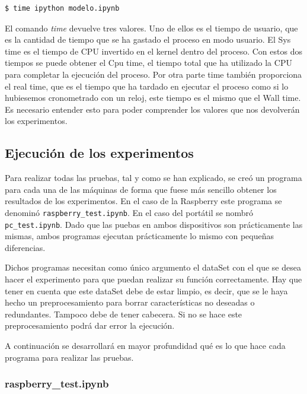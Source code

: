 \documentclass[a4paper, 12pt]{book}
\begin{document}
\begin{lstlisting}[language=bash]
  $ time ipython modelo.ipynb
\end{lstlisting}

El comando \textit{time} devuelve tres valores. Uno de ellos es el tiempo de usuario, que es la cantidad de tiempo que se ha gastado el proceso en modo usuario. El Sys time es el tiempo de CPU invertido en el kernel dentro del proceso. Con estos dos tiempos se puede obtener el Cpu time, el tiempo total que ha utilizado la CPU para completar la ejecución del proceso. Por otra parte time también proporciona el real time, que es el tiempo que ha tardado en ejecutar el proceso como si lo hubiesemos cronometrado con un reloj, este tiempo es el mismo que el Wall time. Es necesario entender esto para poder comprender los valores que nos devolverán los experimentos.

\subsection{Ejecución de los experimentos}
\label{subsec:ejecucion_experimentos}

Para realizar todas las pruebas, tal y como se han explicado, se creó un programa para cada una de las máquinas de forma que fuese más sencillo obtener los resultados de los experimentos. En el caso de la Raspberry este programa se denominó \texttt{raspberry\_test.ipynb}. En el caso del portátil se nombró \texttt{pc\_test.ipynb}. Dado que las puebas en ambos dispositivos son prácticamente las mismas, ambos programas ejecutan prácticamente lo mismo con pequeñas diferencias.

Dichos programas necesitan como único argumento el dataSet con el que se desea hacer el experimento para que puedan realizar su función correctamente.
Hay que tener en cuenta que este dataSet debe de estar limpio, es decir, que se le haya hecho un preprocesamiento para borrar características no deseadas o redundantes. Tampoco debe de tener cabecera. Si no se hace este preprocesamiento podrá dar error la ejecución.

A continuación se desarrollará en mayor profundidad qué es lo que hace cada programa para realizar las pruebas.


\subsubsection{raspberry\_test.ipynb}
\label{subsubsec:programa_pruebas_raspberry}
\end{document}
